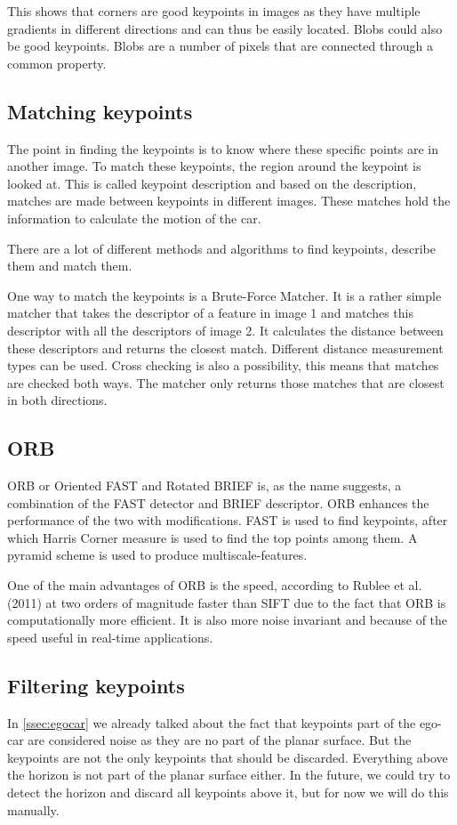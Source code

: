 This shows that corners are good keypoints in images as they have multiple gradients in different directions and can thus be easily located. Blobs could also be good keypoints. Blobs are a number of pixels that are connected through a common property.

\subsection{Matching keypoints}
The point in finding the keypoints is to know where these specific points are in another image. To match these keypoints, the region around the keypoint is looked at. This is called keypoint description and based on the description, matches are made between keypoints in different images. These matches hold the information to calculate the motion of the car.\bigskip

There are a lot of different methods and algorithms to find keypoints, describe them and match them.\bigskip

One way to match the keypoints is a Brute-Force Matcher. It is a rather simple matcher that takes the descriptor of a feature in image 1 and matches this descriptor with all the descriptors of image 2. It calculates the distance between these descriptors and returns the closest match. Different distance measurement types can be used. Cross checking is also a possibility, this means that matches are checked both ways. The matcher only returns those matches that are closest in both directions.

\subsection{ORB}
ORB or Oriented FAST and Rotated BRIEF is, as the name suggests, a combination of the FAST detector and BRIEF descriptor. ORB enhances the performance of the two with modifications. FAST is used to find keypoints, after which Harris Corner measure is used to find the top points among them. A pyramid scheme is used to produce multiscale-features. \bigskip 

One of the main advantages of ORB is the speed, according to Rublee et al. (2011) \cite{6126544} at two orders of magnitude faster than SIFT due to the fact that ORB is computationally more efficient. It is also more noise invariant and because of the speed useful in real-time applications.

\subsection{Filtering keypoints}
In \autoref{ssec:egocar} we already talked about the fact that keypoints part of the ego-car are considered noise as they are no part of the planar surface. But the keypoints are not the only keypoints that should be discarded. Everything above the horizon is not part of the planar surface either. In the future, we could try to detect the horizon and discard all keypoints above it, but for now we will do this manually.

